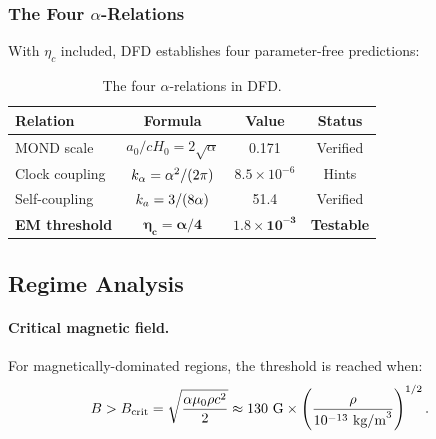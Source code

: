 \subsubsection{The Four $\alpha$-Relations}

With $\eta_c$ included, DFD establishes four parameter-free predictions:

\begin{table}[h]
\caption{The four $\alpha$-relations in DFD.}
\label{tab:alpha-four}
\begin{ruledtabular}
\begin{tabular}{lccc}
Relation & Formula & Value & Status \\
\hline
MOND scale & $a_0/cH_0 = 2\sqrt{\alpha}$ & 0.171 & Verified \\
Clock coupling & $k_\alpha = \alpha^2/(2\pi)$ & $8.5\times10^{-6}$ & Hints \\
Self-coupling & $k_a = 3/(8\alpha)$ & 51.4 & Verified \\
\textbf{EM threshold} & $\boldsymbol{\eta_c = \alpha/4}$ & $\boldsymbol{1.8\times10^{-3}}$ & \textbf{Testable} \\
\end{tabular}
\end{ruledtabular}
\end{table}

\subsection{Regime Analysis}\label{sec:regime-analysis}

\paragraph{Critical magnetic field.}
For magnetically-dominated regions, the threshold is reached when:
\begin{equation}
B > B_{\rm crit} = \sqrt{\frac{\alpha\mu_0\rho c^2}{2}} \approx 130~\text{G} \times \left(\frac{\rho}{10^{-13}~\text{kg/m}^3}\right)^{1/2}.
\label{eq:B-crit}
\end{equation}

